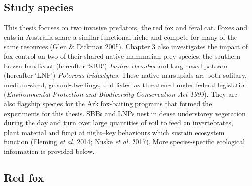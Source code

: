 \documentclass[11pt,a4paper,titlepage,twoside,openright]{style/unimelbthesis}
\begin{document}
\begin{mainmatter}
\hypertarget{study-species}{%
\section{Study species}\label{study-species}}

This thesis focuses on two invasive predators, the red fox and feral cat. Foxes and cats in Australia share a similar functional niche and compete for many of the same resources (Glen \& Dickman 2005). Chapter 3 also investigates the impact of fox control on two of their shared native mammalian prey species, the southern brown bandicoot (hereafter `SBB') \emph{Isodon obesulus} and long-nosed potoroo (hereafter `LNP') \emph{Potorous tridactylus}. These native marsupials are both solitary, medium-sized, ground-dwellings, and listed as threatened under federal legislation (\emph{Environmental Protection and Biodiversity Conservation Act 1999}). They are also flagship species for the Ark fox-baiting programs that formed the experiments for this thesis. SBBs and LNPs nest in dense understorey vegetation during the day and turn over large quantities of soil to feed on invertebrates, plant material and fungi at night--key behaviours which sustain ecosystem function (Fleming \emph{et al.} 2014; Nuske \emph{et al.} 2017). More species-specific ecological information is provided below.

\hypertarget{red-fox}{%
\subsection{Red fox}\label{red-fox}}


\end{mainmatter}
\end{document}
